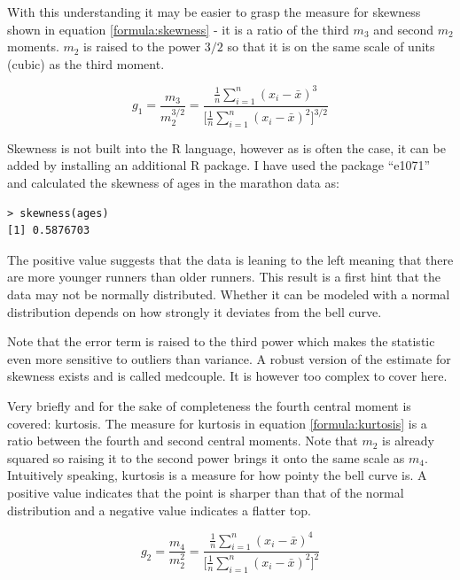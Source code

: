 \documentclass{tufte-book} %
\begin{document}
With this understanding it may be easier to grasp the measure for skewness shown in equation \ref{formula:skewness} - it is a ratio of the third $m_3$ and second $m_2$ moments. $m_2$ is raised to the power $3/2$ so that it is on the same scale of units (cubic) as the third moment. 

\begin{equation} \label{formula:skewness}
	g_1 = \frac{m_3}{m_2^{3/2}} = 
	\frac{\frac{1}{n}\sum_{i=1}^{n}(x_i - \bar{x})^3}
	{\Big[\frac{1}{n}\sum_{i=1}^{n}(x_i - \bar{x})^2\Big]^{3/2}}
\end{equation}

Skewness is not built into the R language, however as is often the case, it can be added by installing an additional R package. I have used the package ``e1071'' and calculated the skewness of ages in the marathon data as:

\begin{Verbatim}
> skewness(ages)
[1] 0.5876703
\end{Verbatim}

The positive value suggests that the data is leaning to the left meaning that there are more younger runners than older runners. This result is a first hint that the data may not be normally distributed. Whether it can be modeled with a normal distribution depends on how strongly it deviates from the bell curve.

Note that the error term is raised to the third power which makes the statistic even more sensitive to outliers than variance. A robust version of the estimate for skewness exists and is called medcouple\cite{Brys2004}. It is however too complex to cover here.

Very briefly and for the sake of completeness the fourth central moment is covered: kurtosis. The measure for kurtosis in equation \ref{formula:kurtosis} is a ratio between the fourth and second central moments. Note that $m_2$ is already squared so raising it to the second power brings it onto the same scale as $m_4$. Intuitively speaking, kurtosis is a measure for how pointy the bell curve is. A positive value indicates that the point is sharper than that of the normal distribution and a negative value indicates a flatter top.

\begin{equation} \label{formula:kurtosis}
	g_2 = \frac{m_4}{m_2^{2}} = 
	\frac{\frac{1}{n}\sum_{i=1}^{n}(x_i - \bar{x})^4}
	{\Big[\frac{1}{n}\sum_{i=1}^{n}(x_i - \bar{x})^2\Big]^{2}}
\end{equation}
\end{document}
